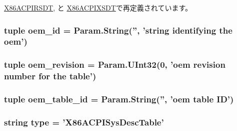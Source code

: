 \hyperlink{classACPI_1_1X86ACPIRSDT_a17da7064bc5c518791f0c891eff05fda}{X86ACPIRSDT}, と \hyperlink{classACPI_1_1X86ACPIXSDT_a17da7064bc5c518791f0c891eff05fda}{X86ACPIXSDT}で再定義されています。\hypertarget{classACPI_1_1X86ACPISysDescTable_a92058ac009c691aede73e4bf13dbbb94}{
\subsubsection[{oem\_\-id}]{\setlength{\rightskip}{0pt plus 5cm}tuple {\bf oem\_\-id} = Param.String('', 'string identifying the oem')}}
\label{classACPI_1_1X86ACPISysDescTable_a92058ac009c691aede73e4bf13dbbb94}
\hypertarget{classACPI_1_1X86ACPISysDescTable_a2ceceaea19237ad1dc779d036fb5891d}{
\subsubsection[{oem\_\-revision}]{\setlength{\rightskip}{0pt plus 5cm}tuple {\bf oem\_\-revision} = Param.UInt32(0, 'oem revision number for the table')}}
\label{classACPI_1_1X86ACPISysDescTable_a2ceceaea19237ad1dc779d036fb5891d}
\hypertarget{classACPI_1_1X86ACPISysDescTable_a1b14b06ab0bc704cb78c2241879d5c21}{
\subsubsection[{oem\_\-table\_\-id}]{\setlength{\rightskip}{0pt plus 5cm}tuple {\bf oem\_\-table\_\-id} = Param.String('', 'oem table ID')}}
\label{classACPI_1_1X86ACPISysDescTable_a1b14b06ab0bc704cb78c2241879d5c21}
\hypertarget{classACPI_1_1X86ACPISysDescTable_acce15679d830831b0bbe8ebc2a60b2ca}{
\subsubsection[{type}]{\setlength{\rightskip}{0pt plus 5cm}string {\bf type} = '{\bf X86ACPISysDescTable}'}}
\label{classACPI_1_1X86ACPISysDescTable_acce15679d830831b0bbe8ebc2a60b2ca}


